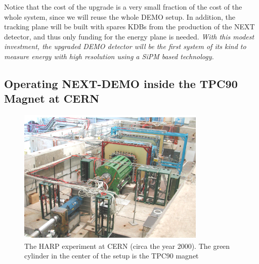 
Notice that the cost of the upgrade is a very small fraction of the cost of the whole system, since we will reuse the whole DEMO setup. In addition, the tracking plane will be built with spares KDBs from the production of the NEXT detector, and thus only funding for the energy plane is needed. {\em With this modest investment, the upgraded DEMO detector will be the first system of its kind to measure energy with high resolution using a SiPM based technology.} 

\subsection*{Operating NEXT-DEMO inside the TPC90 Magnet at CERN}
\begin{figure}
\centering
\includegraphics[width=0.8\textwidth]{img/Harp.png}
\caption{\small The HARP experiment at CERN (circa the year 2000). The green cylinder in the center of the setup is the TPC90 magnet } \label{fig.Harp}
\end{figure}

